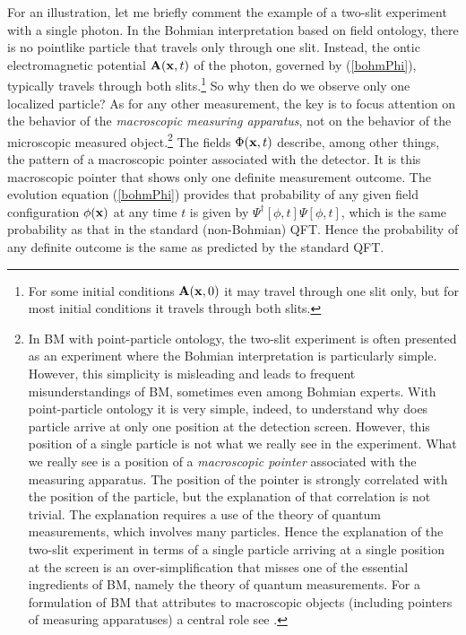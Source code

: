 \documentclass[12pt]{article}
\begin{document}
For an illustration, let me briefly comment the example of a two-slit experiment with a single photon.
In the Bohmian interpretation based on field ontology, there is no pointlike particle that travels only
through one slit. Instead, the ontic electromagnetic potential ${\bf A}({\bf x},t)$ 
of the photon, governed by (\ref{bohmPhi}), typically travels through both slits.\footnote{For some initial conditions
${\bf A}({\bf x},0)$ it may travel through one slit only, but for most initial conditions it travels through both slits.}
So why then do we observe only one localized particle? As for any other measurement, the key is to focus attention
on the behavior of the {\em macroscopic measuring apparatus}, 
not on the behavior of the microscopic measured object.\footnote{In BM with point-particle ontology, the  
two-slit experiment is often presented as an experiment where the Bohmian interpretation is particularly 
simple. However, this simplicity is misleading and leads to frequent misunderstandings of BM, sometimes 
even among Bohmian experts. With point-particle ontology it is very simple, indeed, to understand why does particle 
arrive at only one position at the detection screen. However, this position of a single particle is not what we 
really see in the experiment.
What we really see is a position of a {\em macroscopic pointer} associated with the measuring apparatus.
The position of the pointer is strongly correlated with the position of the particle, 
but the explanation of that correlation is not trivial.
The explanation requires a use of the theory of quantum measurements, which involves many particles.
Hence the explanation of the two-slit experiment in terms of a single particle arriving 
at a single position at the screen is an over-simplification that misses one of the essential ingredients 
of BM, namely the theory of quantum measurements. For a formulation of BM that attributes to macroscopic 
objects (including pointers of measuring apparatuses) 
a central role see \cite{nikIBM}.}
The fields $\Phi({\bf x},t)$ describe, among other things, the pattern of a macroscopic pointer associated with the detector.
It is this macroscopic pointer that shows only one definite measurement outcome.
The evolution equation (\ref{bohmPhi}) provides that probability of any given field configuration 
$\phi({\bf x})$ at any time $t$ is given by $\Psi^{\dagger}[\phi,t]\Psi[\phi,t]$, which is the same probability 
as that in the standard (non-Bohmian) QFT. 
Hence the probability of any definite outcome is the same as predicted by the standard QFT.
\end{document}
